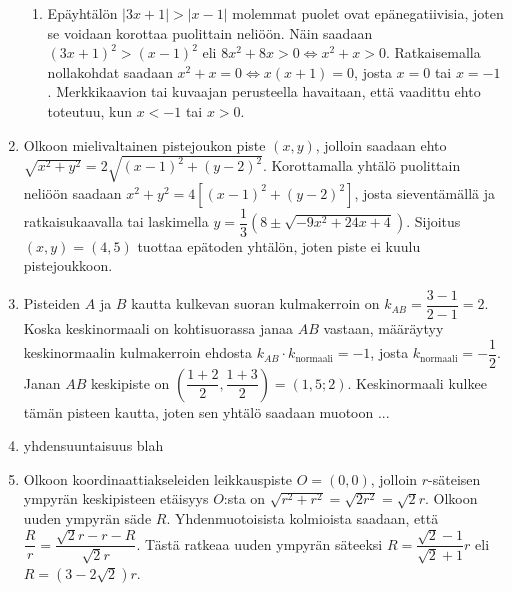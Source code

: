 \documentclass[12pt,fleqn]{article}
\begin{document}
\begin{enumerate}[label=\textbf{\arabic*.}]
\begin{enumerate}[label=\textbf{\alph*)}]
\item Epäyhtälön \(|3x+1|>|x-1|\) molemmat puolet ovat epänegatiivisia, joten se voidaan korottaa puolittain neliöön. Näin saadaan \((3x+1)^2>(x-1)^2\) eli \(8x^2+8x>0 \Leftrightarrow x^2+x>0\). Ratkaisemalla nollakohdat saadaan \(x^2+x=0\Leftrightarrow x(x+1)=0\), josta \(x=0\) tai \(x=-1\). Merkkikaavion tai kuvaajan perusteella havaitaan, että vaadittu ehto toteutuu, kun \(x<-1\) tai \(x>0\).
\end{enumerate}

\item Olkoon mielivaltainen pistejoukon piste \((x,y)\), jolloin saadaan ehto \(\sqrt{x^2+y^2}=2\sqrt{(x-1)^2+(y-2)^2}\). Korottamalla yhtälö puolittain neliöön saadaan \(x^2+y^2=4[(x-1)^2+(y-2)^2]\), josta sieventämällä ja ratkaisukaavalla tai laskimella \(y=\dfrac{1}{3}(8\pm \sqrt{-9x^2+24x+4})\). Sijoitus \((x,y)=(4,5)\) tuottaa epätoden yhtälön, joten piste ei kuulu pistejoukkoon.

\item Pisteiden \(A\) ja \(B\) kautta kulkevan suoran kulmakerroin on \(k_{AB}=\dfrac{3-1}{2-1}=2\). Koska keskinormaali on kohtisuorassa janaa \(AB\) vastaan, määräytyy keskinormaalin kulmakerroin ehdosta \(k_{AB}\cdot k_\text{normaali}=-1\), josta \(k_\text{normaali}=-\dfrac{1}{2}\). Janan \(AB\) keskipiste on \(\left (\dfrac{1+2}{2}, \dfrac{1+3}{2}\right )=(1,5; 2)\). Keskinormaali kulkee tämän pisteen kautta, joten sen yhtälö saadaan muotoon ...

\item yhdensuuntaisuus blah

\item Olkoon koordinaattiakseleiden leikkauspiste \(O=(0,0)\), jolloin \(r\)-säteisen ympyrän keskipisteen etäisyys \(O\):sta on \(\sqrt{r^2+r^2}=\sqrt{2r^2}=\sqrt{2}r\). Olkoon uuden ympyrän säde \(R\). Yhdenmuotoisista kolmioista saadaan, että \(\dfrac{R}{r}=\dfrac{\sqrt{2}r-r-R}{\sqrt{2}r}\). Tästä ratkeaa uuden ympyrän säteeksi \(R=\dfrac{\sqrt{2}-1}{\sqrt{2}+1}r\) eli \(R=(3-2\sqrt{2})r\).

\end{enumerate}
\end{document}
